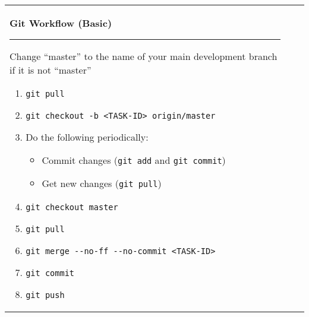 \documentclass[landscape]{article}
\begin{document}
\begin{tabular*}{10.5in}{|p{2.9in}|p{2.9in}|p{2.9in}|}
    \begin{flushleft}
        \textbf{\large{Git Workflow (Basic)}}
        \rule{2.9in}{.5pt}
        \normalsize{Change ``master'' to the name of your main development
        branch if it is not ``master''}
        \small
        \begin{enumerate}
            \item{\verb!git pull!}
            \item{\verb!git checkout -b <TASK-ID> origin/master!}
            \item{Do the following periodically:}
                \begin{itemize}
                    \item{Commit changes (\verb!git add! and \verb!git commit!)}
                    \item{Get new changes (\verb!git pull!)}
                \end{itemize}
            \item{\verb!git checkout master!}
            \item{\verb!git pull!}
            \item{\verb!git merge --no-ff --no-commit <TASK-ID>!}
            \item{\verb!git commit!}
            \item{\verb!git push!}
        \end{enumerate}


\end{flushleft}
\end{tabular*}
\end{document}
